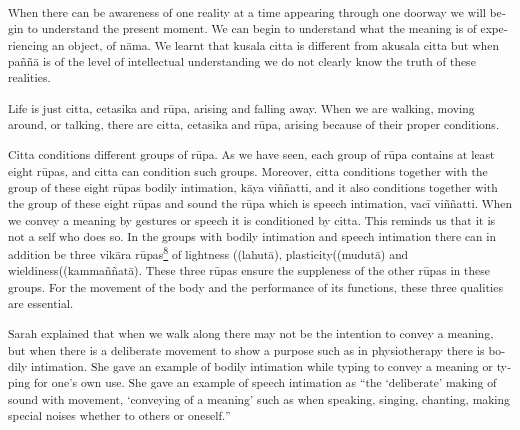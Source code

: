\textsuperscript{\textenglish[variant=american]{When there can be
awareness of one reality at a time appearing through one doorway we will
begin to understand the present moment. }\textdutch{We can begin to
understand what the meaning is of experiencing an object, of nāma. We
learnt that kusala citta is different from akusala citta but when paññā
is of the level of intellectual understanding we do not clearly know the
truth of these realities. }}

\textsuperscript{\textdutch{Life is just citta, cetasika and rūpa,
arising and falling away. When we are walking, moving around, or
talking, there are citta, cetasika and rūpa, arising because of their
proper conditions. }}

\textsuperscript{\textdutch{Citta conditions different groups of rūpa.
As we have seen, each group of rūpa contains at least eight rūpas, and
citta can condition such groups. Moreover, citta conditions together
with the group of these eight rūpas bodily intimation,} k{{ā}}ya
viññ\textitalian{atti}\textdutch{, and it also conditions
}\textenglish[variant=american]{together with the group of these eight
r}ū\textfrench{pas}\textdutch{ and sound the rūpa which is speech
intimation, vacī viññatti. When we convey a meaning by gestures or
speech it is conditioned by citta. This reminds us that it is not a self
who does so. In the groups with bodily intimation and speech intimation
there can in addition be three vikāra
rūpas\protect\hyperlink{sdfootnote8sym}{\textsuperscript{8}} of
lightness (}(lahut\textdanish{ā})\textdutch{,
plasticity(}(mudut\textdanish{ā}\textdutch{)}\textdutch{ and
wieldiness(}(kammaññat\textdanish{ā})\textdutch{. These three rūpas
ensure the suppleness of the other rūpas in these groups.
}\textenglish[variant=american]{For the movement of the body and the
performance of its functions, these three qualities are essential.}}

\textsuperscript{\textdutch{Sarah explained that when we walk along
there may not be the intention to convey a meaning, but when there is a
deliberate movement to show a purpose such as in physiotherapy there is
bodily intimation. She gave an example of bodily intimation while typing
to convey a meaning or typing for one's own }\textdutch{use. She gave an
example of speech intimation as ``t}\textenglish[variant=american]{he
`deliberate' making of sound with movement, `conveying of a meaning'
such as when speaking, singing, chanting, making special noises whether
to others or oneself.}\textdutch{'' }}

